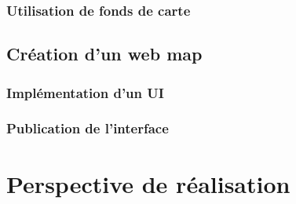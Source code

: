         \subsubsection{Utilisation de fonds de carte}
    \subsection{Création d'un web map} 
        \subsubsection{Implémentation d'un UI}
        \subsubsection{Publication de l'interface}

\section{Perspective de réalisation}